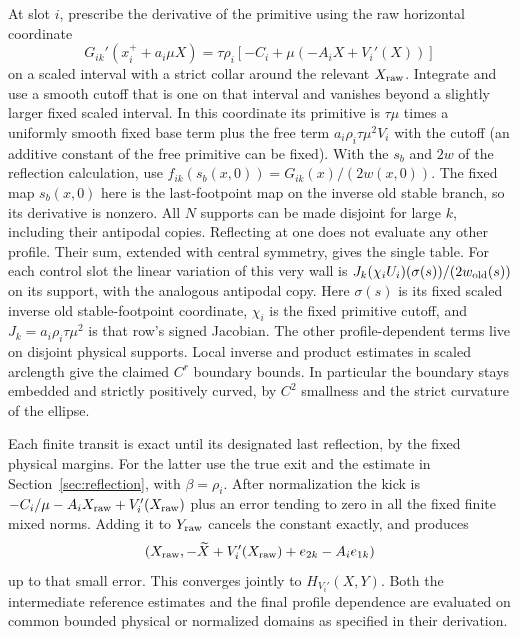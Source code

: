 \documentclass[11pt]{article}
\begin{document}
At slot \(i\), prescribe the derivative of the primitive using the raw
horizontal coordinate \[
 G_{ik}'(x_i^++a_i\mu X)=\tau\rho_i[-C_i+\mu(-A_i X+V_i'(X))]
\] on a scaled interval with a strict collar around the relevant
\(X_{\rm raw}\). Integrate and use a smooth cutoff that is one on that interval
and vanishes beyond a slightly larger fixed scaled interval. In this coordinate
its primitive is \(\tau\mu\) times a uniformly smooth fixed base term plus
the free term \(a_i\rho_i\tau\mu^2 V_i\) with the cutoff (an additive constant
of the free primitive can be fixed). With the \(s_b\) and \(2w\) of the
reflection calculation, use \(f_{ik}(s_b(x,0))=G_{ik}(x)/(2w(x,0))\). The fixed
map \(s_b(x,0)\) here is the last-footpoint map on the inverse old stable
branch, so its derivative is nonzero. All \(N\) supports can be made disjoint
for large \(k\), including their antipodal copies. Reflecting at one does not
evaluate any other profile. Their sum, extended with central symmetry, gives the
single table. For each control slot the linear variation of this very wall is
\(J_k(\chi_i U_i)(\sigma(s))/(2w_{\rm old}(s))\) on its support, with the
analogous antipodal copy. Here \(\sigma(s)\) is its fixed scaled inverse old
stable-footpoint coordinate, \(\chi_i\) is the fixed primitive cutoff, and
\(J_k=a_i\rho_i\tau\mu^2\) is that row's signed Jacobian. The other
profile-dependent terms live on disjoint physical supports. Local inverse and
product estimates in scaled arclength give the claimed \(C^r\) boundary bounds.
In particular the boundary stays embedded and strictly positively curved, by
\(C^2\) smallness and the strict curvature of the ellipse.

Each finite transit is exact until its designated last reflection, by the fixed
physical margins. For the latter use the true exit and the estimate in
Section~\ref{sec:reflection}, with \(\beta=\rho_i\). After
normalization the kick is \(-C_i/\mu-A_iX_{\rm raw}+V_i'(X_{\rm raw})\) plus an
error tending to zero in all the fixed finite mixed norms. Adding it to
\(Y_{\rm raw}\) cancels the constant exactly, and produces \[
 (X_{\rm raw},-\widetilde X+V_i'(X_{\rm raw})+e_{2k}-A_i e_{1k})
\] up to that small error. This converges jointly to \(H_{V_i'}(X,Y)\). Both the
intermediate reference estimates and the final profile dependence are evaluated
on common bounded physical or normalized domains as specified in their
derivation.
\end{document}

